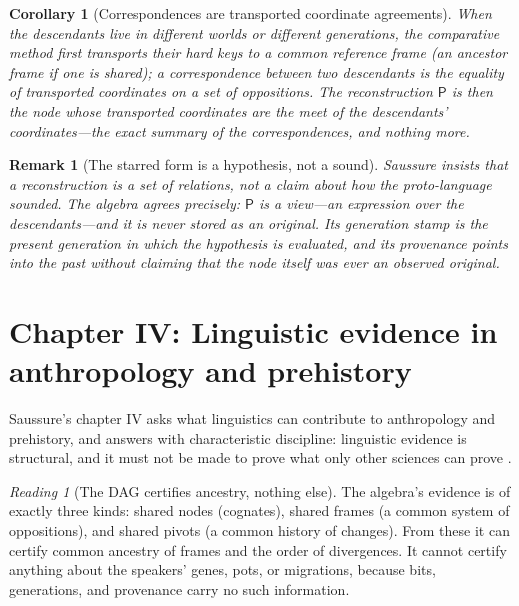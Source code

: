 \documentclass[11pt,a4paper]{article}
\newtheorem{corollary}[principle]{Corollary}
\newtheorem{remark}[principle]{Remark}
\theoremstyle{remark}
\newtheorem{reading}[principle]{Reading}
\newcommand{\Proto}{\ensuremath{\mathsf{P}}}             %
\begin{document}
\begin{corollary}[Correspondences are transported coordinate agreements]
\label{cor:correspondences}
When the descendants live in different worlds or different generations, the
comparative method first transports their hard keys to a common reference
frame (an ancestor frame if one is shared); a \emph{correspondence} between
two descendants is the equality of transported coordinates on a set of
oppositions. The reconstruction $\Proto$ is then the node whose transported
coordinates are the meet of the descendants' coordinates---the exact summary
of the correspondences, and nothing more.
\end{corollary}

\begin{remark}[The starred form is a hypothesis, not a sound]
Saussure insists that a reconstruction is a set of relations, not a claim
about how the proto-language sounded. The algebra agrees precisely: $\Proto$
is a view---an expression over the descendants---and it is never stored as an
original. Its generation stamp is the present generation in which the
hypothesis is evaluated, and its provenance points into the past without
claiming that the node itself was ever an observed original.
\end{remark}

\section{Chapter IV: Linguistic evidence in anthropology and prehistory}
\label{sec:ch4}

Saussure's chapter IV asks what linguistics can contribute to anthropology
and prehistory, and answers with characteristic discipline: linguistic
evidence is structural, and it must not be made to prove what only other
sciences can prove \cite[Part V, ch.~IV]{harris1983}.

\begin{reading}[The DAG certifies ancestry, nothing else]
\label{read:anthropology}
The algebra's evidence is of exactly three kinds: shared nodes (cognates),
shared frames (a common system of oppositions), and shared pivots (a common
history of changes). From these it can certify common ancestry of frames and
the order of divergences. It cannot certify anything about the speakers'
genes, pots, or migrations, because bits, generations, and provenance carry
no such information.
\end{reading}
\end{document}
